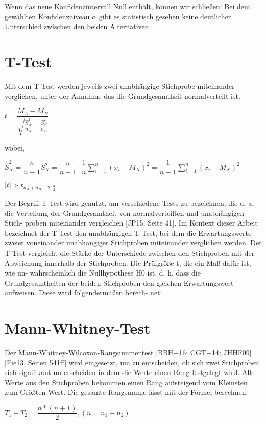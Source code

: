 Wenn das neue Konfidenzintervall Null enthält, können wir schließen:
Bei dem gewählten Konfidenzniveau $\alpha$ gibt es statistisch gesehen keine
deutlicher Unterschied zwischen den beiden Alternativen.

\section{T-Test}
Mit dem T-Test werden jeweils zwei unabhängige Stichprobe miteinander verglichen, 
unter der Annahme das die Grundgesamtheit normalverteilt ist.

\begin{center}
  $t = \dfrac{M_A-M_B}{\sqrt{\frac{\hat{S}_A^2}{n_A} + \frac{\hat{S}_B^2}{n_B}}}$
\end{center}

wobei,

\begin{center}
  $\hat{S}_X^2 = \dfrac{n}{n-1} S_X^2 = \dfrac{n}{n-1} \cdot \dfrac{1}{n} \sum_{i=1}^n (x_i - M_X)^2 = \dfrac{1}{n-1} \sum_{i=1}^n (x_i - M_X)^2$
\end{center}

\begin{center}
  $|t| > t_{n_A + n_B - 2; \frac{\alpha}{2}}$
\end{center}

Der Begriff T-Test wird genutzt, um verschiedene Tests zu bezeichnen, die
u. a. die Verteilung der Grundgesamtheit von normalverteilten und unabhängigen Stich-
proben miteinander vergleichen [JP15, Seite 41]. Im Kontext dieser Arbeit bezeichnet
der T-Test den unabhängigen T-Test, bei dem die Erwartungswerte zweier voneinander
unabhängiger Stichproben miteinander verglichen werden.
Der T-Test vergleicht die Stärke der Unterschiede zwischen den Stichproben mit der
Abweichung innerhalb der Stichproben. Die Prüfgröße t, die ein Maß dafür ist, wie un-
wahrscheinlich die Nullhypothese H0 ist, d. h. dass die Grundgesamtheiten der beiden
Stichproben den gleichen Erwartungswert aufweisen. Diese wird folgendermaßen berech-
net:

\section{Mann-Whitney-Test}
Der Mann-Whitney-Wilcoxon-Rangsummentest [BBH+16; CGT+14; JHHF09]
[Fie13, Seiten 541ff] wird eingesetzt, um zu entscheiden, ob sich zwei
Stichproben sich signifikant unterscheiden in dem die Werte einen Rang festgelegt wird. 
Alle Werte aus den Stichproben bekommen einen Rang aufsteigend vom Kleinsten zum Größten Wert.
Die gesamte Rangsumme lässt mit der Formel berechnen:
\begin{center}
  $T_1 + T_2 = \dfrac{n * (n + 1)}{2}, (n = n_1 + n_2)$
\end{center}  

